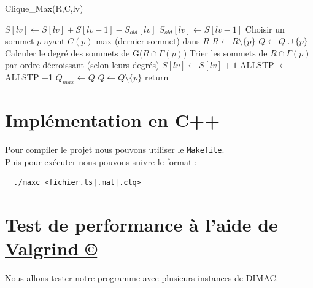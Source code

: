 \documentclass{article}
\begin{document}
\begin{algorithm}
\caption{Clique\_Max(R,C,lv)}
\begin{algorithmic}
  \State $S[lv] \gets S[lv] + S[lv-1] -S_{old}[lv]$
  \State $S_{old}[lv]\gets S[lv-1]$
    \State Choisir un sommet $p$ ayant $C(p)$ max (dernier sommet) dans $R$
    \State $R \gets R \setminus \{p\}$
      \State $Q \gets Q \cup \{p\}$
          \State Calculer le degré des sommets de G($R \cap \Gamma(p)$)
          \State Trier les sommets de $R \cap \Gamma(p)$ par ordre décroissant
          \State (selon leurs degrés)
        \EndIf
        \State {}
        \State $S[lv] \gets S[lv]+1$
        \State ALLSTP $\gets$ ALLSTP +1
        \State  {}
        $Q_{max} \gets Q$
      \EndIf
      \State $Q \gets Q\setminus \{p\}$
    \Else
      \State return
    \EndIf
  \EndWhile
\EndProcedure
\end{algorithmic}
\end{algorithm}
\section{Implémentation en C++}
Pour compiler le projet nous pouvons utiliser le \texttt{Makefile}.\\
Puis pour exécuter nous pouvons suivre le format :
\begin{verbatim}
  ./maxc <fichier.ls|.mat|.clq>
\end{verbatim}
\section{Test de performance à l'aide de \href{http://www.valgrind.org/}{Valgrind ©}}
Nous allons tester notre programme avec plusieurs instances de \href{https://turing.cs.hbg.psu.edu/txn131/clique.html}{DIMAC}.\\
\end{document}
